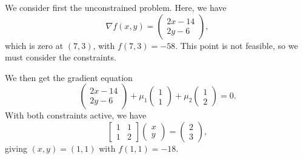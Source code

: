 \begin{solution}
  We consider first the unconstrained problem.
  Here, we have
  \begin{equation}
    \nabla f(x, y) =
    \begin{pmatrix}
      2x - 14 \\
      2y - 6
    \end{pmatrix},
  \end{equation}
  which is zero at $(7, 3)$, with $f(7, 3) = -58$.
  This point is not feasible, so we must consider the constraints.

  We then get the gradient equation
  \begin{equation}
    \begin{pmatrix}
      2x - 14 \\
      2y - 6
    \end{pmatrix}
    + \mu_1
    \begin{pmatrix}
      1 \\
      1
    \end{pmatrix}
    + \mu_2
    \begin{pmatrix}
      1 \\
      2
    \end{pmatrix} = 0.
  \end{equation}
  With both constraints active, we have
  \begin{equation}
    \begin{bmatrix}
      1 & 1 \\
      1 & 2
    \end{bmatrix}
    \begin{pmatrix}
      x \\
      y
    \end{pmatrix} =
    \begin{pmatrix}
      2 \\
      3
    \end{pmatrix},
  \end{equation}
  giving $(x, y) = (1, 1)$ with $f(1, 1) = -18$.


\end{solution}
